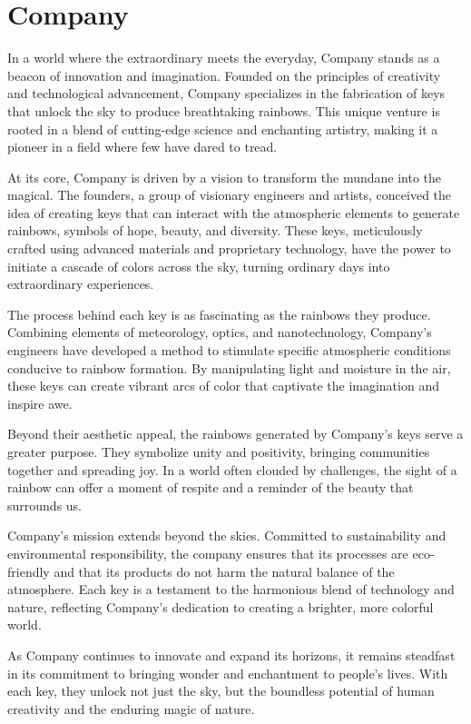 \chapter{Company}
\label{ch: company}

In a world where the extraordinary meets the everyday, Company stands as a beacon of innovation and imagination. Founded on the principles of creativity and technological advancement, Company specializes in the fabrication of keys that unlock the sky to produce breathtaking rainbows. This unique venture is rooted in a blend of cutting-edge science and enchanting artistry, making it a pioneer in a field where few have dared to tread.

At its core, Company is driven by a vision to transform the mundane into the magical. The founders, a group of visionary engineers and artists, conceived the idea of creating keys that can interact with the atmospheric elements to generate rainbows, symbols of hope, beauty, and diversity. These keys, meticulously crafted using advanced materials and proprietary technology, have the power to initiate a cascade of colors across the sky, turning ordinary days into extraordinary experiences.

The process behind each key is as fascinating as the rainbows they produce. Combining elements of meteorology, optics, and nanotechnology, Company’s engineers have developed a method to stimulate specific atmospheric conditions conducive to rainbow formation. By manipulating light and moisture in the air, these keys can create vibrant arcs of color that captivate the imagination and inspire awe.

Beyond their aesthetic appeal, the rainbows generated by Company’s keys serve a greater purpose. They symbolize unity and positivity, bringing communities together and spreading joy. In a world often clouded by challenges, the sight of a rainbow can offer a moment of respite and a reminder of the beauty that surrounds us.

Company’s mission extends beyond the skies. Committed to sustainability and environmental responsibility, the company ensures that its processes are eco-friendly and that its products do not harm the natural balance of the atmosphere. Each key is a testament to the harmonious blend of technology and nature, reflecting Company’s dedication to creating a brighter, more colorful world.

As Company continues to innovate and expand its horizons, it remains steadfast in its commitment to bringing wonder and enchantment to people's lives. With each key, they unlock not just the sky, but the boundless potential of human creativity and the enduring magic of nature.


